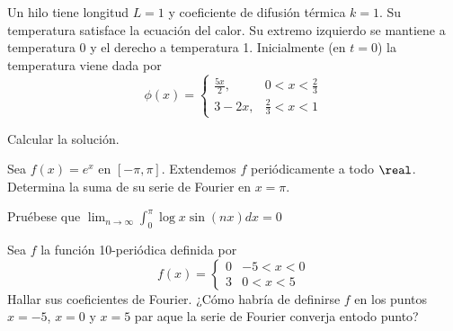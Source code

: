 \begin{problem}[9] Un hilo tiene longitud $ L=1 $ y coeficiente de difusión térmica $ k=1 $. Su temperatura satisface la ecuación del calor. Su extremo izquierdo se mantiene a temperatura 0 y el derecho a temperatura 1. Inicialmente (en $ t=0 $) la temperatura viene dada por \[ \phi(x) = \begin{cases}
	\frac{5x}{2}, & 0<x<\frac{2}{3} \\
	3-2x,         & \frac{2}{3} < x < 1
	\end{cases} \]

Calcular la solución. 

\solution

\end{problem}





\begin{problem}[10] Sea $ f(x) = e^x $ en $ [-\pi, \pi ] $. Extendemos $ f $ periódicamente a todo $ \real $. Determina la suma de su serie de Fourier en $ x = \pi. $


\solution

\end{problem}





\begin{problem}[11]Pruébese que $ \lim_{n\to ∞} \int_{0}^{\pi} \log x \sin (nx) dx = 0 $


\solution

\end{problem}





\begin{problem}[12] Sea $ f $ la función 10-periódica definida por \[f(x) = \begin{cases}
	0 & -5 < x < 0 \\
	3 & 0 < x < 5
\end{cases} \] Hallar sus coeficientes de Fourier. ¿Cómo habría de definirse $ f $ en los puntos $ x=-5 $, $ x=0 $ y $ x=5 $ par aque la serie de Fourier converja entodo punto?


\solution

\end{problem}





